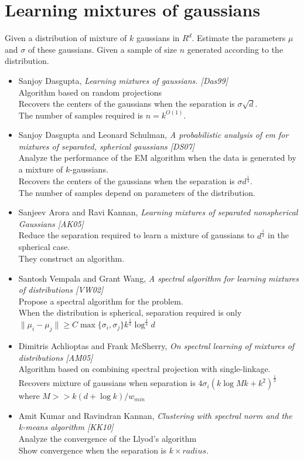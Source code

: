 \documentclass[12pt]{article}
\begin{document}
\section{Learning mixtures of gaussians}

Given a distribution of mixture of $k$ gaussians in $R^d$. Estimate the parameters $\mu$ and $\sigma$ of these gaussians. Given a sample of size $n$ generated according to the distribution.

\begin{itemize}
	\item Sanjoy Dasgupta, {\em Learning mixtures of gaussians. [Das99]}\\
	Algorithm based on random projections\\
	Recovers the centers of the gaussians when the separation is $\sigma \sqrt d$.\\
	The number of samples required is $n = k^{O(1)}$.
	
	\item Sanjoy Dasgupta and Leonard Schulman, {\em A probabilistic analysis of em for mixtures of separated, spherical gaussians [DS07]} \\
	Analyze the performance of the EM algorithm when the data is generated by a mixture of $k$-gaussians.\\
	Recovers the centers of the gaussians when the separation is $\sigma d^{\frac{1}{4}}$.\\
	The number of samples depend on parameters of the distribution.
	
	\item Sanjeev Arora and Ravi Kannan, {\em Learning mixtures of separated nonspherical Gaussians [AK05]}\\
	Reduce the separation required to learn a mixture of gaussians to $d^{\frac{1}{4}}$ in the spherical case.\\
	They construct an algorithm.
	
	\item Santosh Vempala and Grant Wang, {\em A spectral algorithm for learning mixtures of distributions [VW02]}\\
	Propose a spectral algorithm for the problem.\\
	When the distribution is spherical, separation required is only $\|\mu_i - \mu_j\| \ge C \max \{\sigma_i, \sigma_j \} k^{\frac{1}{4}}\log^{\frac{1}{4}}d$
	
	\item Dimitris Achlioptas and Frank McSherry, {\em On spectral learning of mixtures of distributions [AM05]}\\
	Algorithm based on combining spectral projection with single-linkage.\\
	Recovers mixture of gaussians when separation is $4\sigma_i(k\log Mk + k^2)^{\frac{1}{2}}$ where $M >> k(d+ \log k)/w_{min}$
	
	\item Amit Kumar and Ravindran Kannan, {\em Clustering with spectral norm and the k-means algorithm [KK10]}\\
	Analyze the convergence of the Llyod's algorithm\\
	Show convergence when the separation is $k \times radius$. 
\end{itemize}
\end{document}

